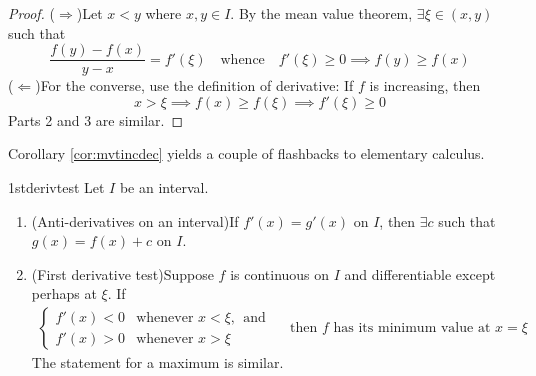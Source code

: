 \begin{proof}
($\Rightarrow$)\quad Let $x<y$ where $x,y\in I$. By the mean value theorem, $\exists\xi\in(x,y)$ such that
\[\frac{f(y)-f(x)}{y-x}=f'(\xi)\quad\text{whence}\quad f'(\xi)\ge 0\implies f(y)\ge f(x)\]
($\Leftarrow$)\quad For the converse, use the definition of derivative:  If $f$ is increasing, then
\[x>\xi\implies f(x)\ge f(\xi)\implies f'(\xi)\ge 0\]
Parts 2 and 3 are similar.
\end{proof}

Corollary \ref{cor:mvtincdec} yields a couple of flashbacks to elementary calculus.

\begin{cor}{}{1stderivtest}
Let $I$ be an interval.
\begin{enumerate}
  \item (Anti-derivatives on an interval)\quad If $f'(x)=g'(x)$ on $I$, then $\exists c$ such that $g(x)=f(x)+c$ on $I$. %
  \item (First derivative test)\quad Suppose $f$ is continuous on $I$ and differentiable except perhaps at $\xi$. If
	\begin{gather*}
		\begin{cases}
		f'(x)<0&\text{whenever }x<\xi,\ \ \text{and}\\
		f'(x)>0&\text{whenever }x>\xi
		\end{cases}\quad \text{ then $f$ has its minimum value at $x=\xi$}
	\end{gather*}
	The statement for a maximum is similar.
\end{enumerate}
\end{cor}


